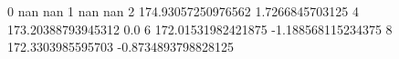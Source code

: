 0 nan nan
1 nan nan
2 174.93057250976562 1.7266845703125
4 173.20388793945312 0.0
6 172.01531982421875 -1.188568115234375
8 172.3303985595703 -0.8734893798828125

